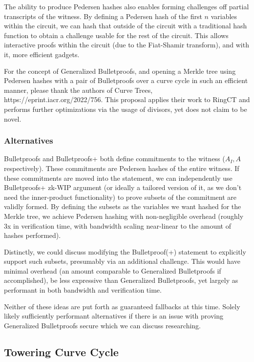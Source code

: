 \documentclass[]{article}
\begin{document}
The ability to produce Pedersen hashes also enables forming challenges off partial transcripts of the witness. By defining a Pedersen hash of the first $n$ variables within the circuit, we can hash that outside of the circuit with a traditional hash function to obtain a challenge usable for the rest of the circuit. This allows interactive proofs within the circuit (due to the Fiat-Shamir transform), and with it, more efficient gadgets.

For the concept of Generalized Bulletproofs, and opening a Merkle tree using Pedersen hashes with a pair of Bulletproofs over a curve cycle in such an efficient manner, please thank the authors of Curve Trees, https://eprint.iacr.org/2022/756. This proposal applies their work to RingCT and performs further optimizations via the usage of divisors, yet does not claim to be novel.

\subsubsection{Alternatives}

Bulletproofs and Bulletproofs+ both define commitments to the witness ($A_I, A$ respectively). These commitments are Pedersen hashes of the entire witness. If these commitments are moved into the statement, we can independently use Bulletproofs+ zk-WIP argument (or ideally a tailored version of it, as we don't need the inner-product functionality) to prove subsets of the commitment are validly formed. By defining the subsets as the variables we want hashed for the Merkle tree, we achieve Pedersen hashing with non-negligible overhead (roughly 3x in verification time, with bandwidth scaling near-linear to the amount of hashes performed).

Distinctly, we could discuss modifying the Bulletproof(+) statement to explicitly support such subsets, presumably via an additional challenge. This would have minimal overhead (an amount comparable to Generalized Bulletproofs if accomplished), be less expressive than Generalized Bulletproofs, yet largely as performant in both bandwidth and verification time.

Neither of these ideas are put forth as guaranteed fallbacks at this time. Solely likely sufficiently performant alternatives if there is an issue with proving Generalized Bulletproofs secure which we can discuss researching.

\subsection{Towering Curve Cycle}
\end{document}
